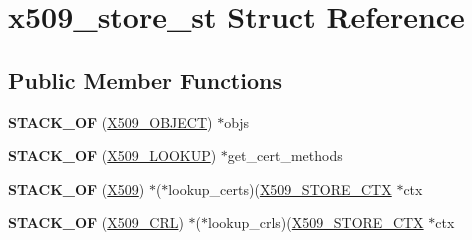 \hypertarget{structx509__store__st}{}\section{x509\+\_\+store\+\_\+st Struct Reference}
\label{structx509__store__st}
\subsection*{Public Member Functions}
\begin{DoxyCompactItemize}
\item 
\mbox{\label{structx509__store__st_a3802443396e8862b5ab6c22172cfd6ff}} 
{\bfseries S\+T\+A\+C\+K\+\_\+\+OF} (\hyperlink{structx509__object__st}{X509\+\_\+\+O\+B\+J\+E\+CT}) $\ast$objs
\item 
\mbox{\label{structx509__store__st_aefdf9aec0a4c6f004e6d60aebe25e277}} 
{\bfseries S\+T\+A\+C\+K\+\_\+\+OF} (\hyperlink{structx509__lookup__st}{X509\+\_\+\+L\+O\+O\+K\+UP}) $\ast$get\+\_\+cert\+\_\+methods
\item 
\mbox{\label{structx509__store__st_ae58df4d40c98ddc37a455e00a000aef0}} 
{\bfseries S\+T\+A\+C\+K\+\_\+\+OF} (\hyperlink{structx509__st}{X509}) $\ast$($\ast$lookup\+\_\+certs)(\hyperlink{structx509__store__ctx__st}{X509\+\_\+\+S\+T\+O\+R\+E\+\_\+\+C\+TX} $\ast$ctx
\item 
\mbox{\label{structx509__store__st_a88a0eb9a5c3d18308bcf136143572ca8}} 
{\bfseries S\+T\+A\+C\+K\+\_\+\+OF} (\hyperlink{struct_x509__crl__st}{X509\+\_\+\+C\+RL}) $\ast$($\ast$lookup\+\_\+crls)(\hyperlink{structx509__store__ctx__st}{X509\+\_\+\+S\+T\+O\+R\+E\+\_\+\+C\+TX} $\ast$ctx
\end{DoxyCompactItemize}
